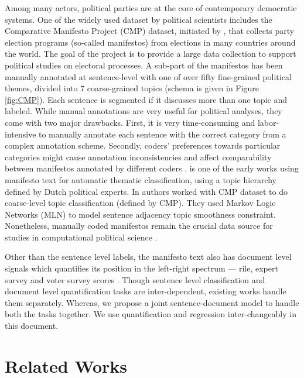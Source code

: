 \documentclass[11pt,a4paper]{article}
\begin{document}
Among many actors, political parties are at the core of contemporary democratic systems. One of the widely used dataset by political scientists includes the Comparative
Manifesto Project (CMP) dataset, initiated by \cite{CMP}, that collects party election programs (so-called manifestos) from elections in many countries around the world. The goal of the project is to provide a large data collection to support political studies on electoral processes. A sub-part of the manifestos has been manually annotated at sentence-level with one of over fifty fine-grained political themes, divided into 7 coarse-grained topics (schema is given in Figure \ref{fig:CMP}). Each sentence is segmented if it discusses more than one topic and labeled. While manual annotations are very useful for political analyses, they come with two major drawbacks. First, it is very time-consuming and labor-intensive to manually annotate each sentence with the correct category from a complex annotation scheme. Secondly, coders' preferences towards particular categories might cause annotation inconsistencies and affect comparability between manifestos annotated by different coders \cite{coder}. \cite{verberne2014automatic} is one of the early works using manifesto text for automatic thematic classification, using a topic hierarchy defined by Dutch political experts. In \cite{zirn2016classifying} authors worked with CMP dataset to do coarse-level topic classification (defined by CMP). They used Markov Logic Networks (MLN) to model sentence adjacency topic smoothness constraint. Nonetheless, manually coded manifestos remain the crucial data source for studies in computational political science \cite{lowe2011scaling, nanni}. 

Other than the sentence level labels, the manifesto text also has document level signals 
which quantifies its position in the left-right spectrum --- rile, expert survey and voter survey scores \cite{slapin2008scaling}. Though sentence level classification and document level quantification tasks are inter-dependent, existing works handle them separately.  Whereas, we propose a joint sentence-document model to handle both the tasks together. We use quantification and regression inter-changeably in this document.

\section{Related Works}
\end{document}
